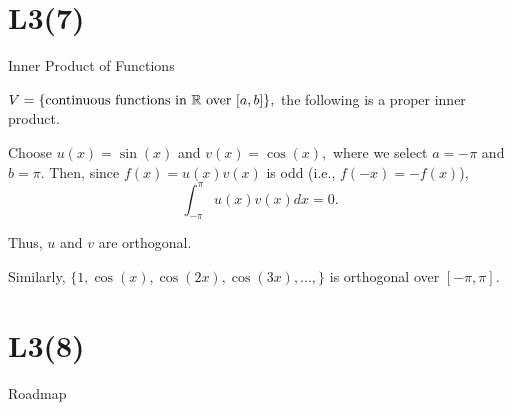 \documentclass[handout,fleqn,aspectratio=169]{beamer}
\begin{document}
\section{L3(7)}
\begin{frame}{Inner Product of Functions}

\plitemsep 0.15in

\bci 

\item {} $V=\{\text{continuous functions in ${\mathbb R}$ over $[a,b]$} \},$ the following is a proper inner product. 

\item \exam Choose $u(x) = \sin(x)$ and $v(x)= \cos(x),$ where we select $a=-\pi$ and $b=\pi.$ Then, since $f(x) = u(x)v(x)$ is odd (i.e., $f(-x) = -f(x)$), 
$$
\int_{-\pi}^\pi u(x) v(x) dx =0.
$$

\item Thus, $u$ and $v$ are orthogonal. 

\item Similarly, $\{1, \cos(x), \cos(2x), \cos(3x), \ldots,  \}$ is orthogonal over $[-\pi,\pi].$
\eci


\end{frame}



\section{L3(8)}
\begin{frame}{Roadmap}

\plitemsep 0.1in

\bce[(1)] 
\item {}

\item {}

\item {}

\ece
\end{frame}
\end{document}
